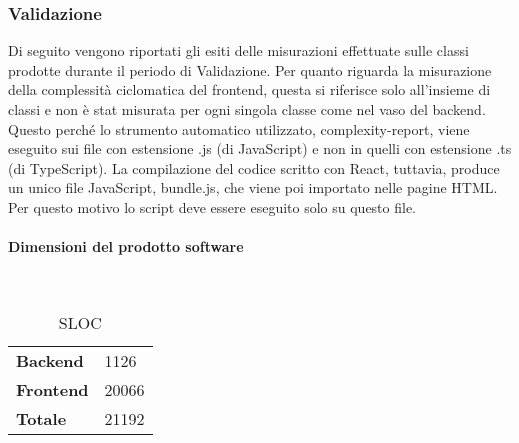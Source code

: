 \subsubsection{Validazione}
Di seguito vengono riportati gli esiti delle misurazioni effettuate sulle classi prodotte durante il periodo di Validazione.
Per quanto riguarda la misurazione della complessità ciclomatica del frontend, questa si riferisce solo all'insieme di classi e non è stat misurata per ogni singola classe come nel vaso del backend. Questo perché lo strumento automatico utilizzato, complexity-report, viene eseguito sui file con estensione .js (di JavaScript) e non in quelli con estensione .ts (di TypeScript). La compilazione del codice scritto con React, tuttavia, produce un unico file JavaScript, bundle.js, che viene poi importato nelle pagine HTML. Per questo motivo lo script deve essere eseguito solo su questo file.

\paragraph{Dimensioni del prodotto software} \mbox{} \\
\begin{table}[H]
\centering
\begin{tabular}{|l|l|}
\cline{1-2}
\textbf{Backend} & 1126 \\ \cline{1-2} 
\textbf{Frontend} & 20066 \\ \cline{1-2} 
\textbf{Totale} & 21192 \\ \cline{1-2}
\end{tabular}
\caption{SLOC}
\end{table}

